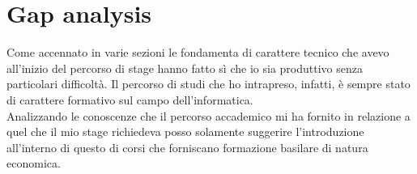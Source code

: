 
\section{Gap analysis}

Come accennato in varie sezioni le fondamenta di carattere tecnico che avevo all'inizio del percorso di stage hanno fatto sì che io sia produttivo senza particolari difficoltà. Il percorso di studi che ho intrapreso, infatti, è sempre stato di carattere formativo sul campo dell'informatica.\\


Analizzando le conoscenze che il percorso accademico mi ha fornito in relazione a quel che il mio stage richiedeva posso solamente suggerire l'introduzione all'interno di questo di corsi che forniscano formazione basilare di natura economica.\\



